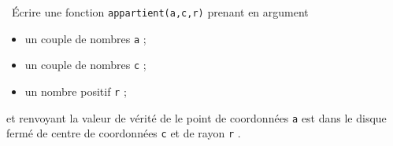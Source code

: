 \exer{}
\setcounter{numques}{0}

\question\ Écrire une fonction \texttt{appartient(a,c,r)} prenant en argument 
\begin{itemize}
  \item un couple de nombres \texttt{a} ; 
  \item un couple de nombres \texttt{c} ; 
  \item un nombre positif \texttt{r} ;
\end{itemize}
et renvoyant la valeur de vérité de \og le point de coordonnées \texttt{a} est dans le disque fermé de centre de coordonnées \texttt{c} et de rayon \texttt{r} \fg. 